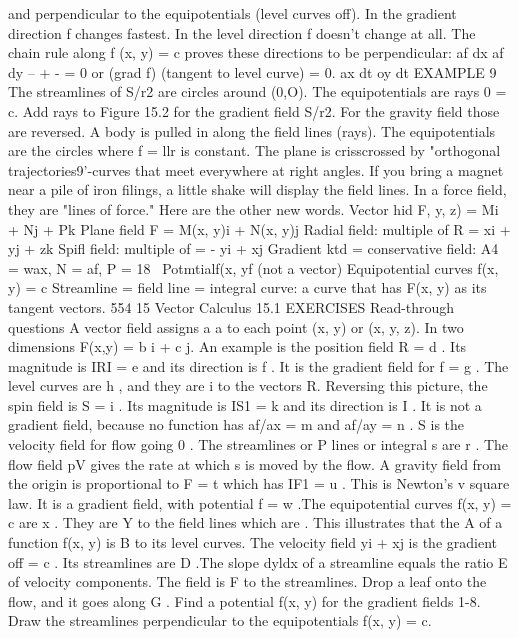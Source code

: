 and perpendicular to the equipotentials (level curves off).
In the gradient direction f changes fastest. In the level direction f doesn't change at
all. The chain rule along f (x, y) = c proves these directions to be perpendicular:
af dx af dy -- + - = 0 or (grad f) (tangent to level curve) = 0.
ax dt oy dt
EXAMPLE 9 The streamlines of S/r2 are circles around (0,O). The equipotentials are
rays 0 = c. Add rays to Figure 15.2 for the gradient field S/r2.
For the gravity field those are reversed. A body is pulled in along the field lines (rays).
The equipotentials are the circles where f = llr is constant. The plane is crisscrossed
by "orthogonal trajectories9'-curves that meet everywhere at right angles.
If you bring a magnet near a pile of iron filings, a little shake will display the field
lines. In a force field, they are "lines of force." Here are the other new words.
Vector hid F, y, z) = Mi + Nj + Pk Plane field F = M(x, y)i + N(x, y)j
Radial field: multiple of R = xi + yj + zk Spifl field: multiple of  = - yi + xj
Gradient ktd = conservative field: A4 = wax, N = af, P = 18~
Potmtialf(x, yf (not a vector) Equipotential curves f(x, y) = c
Streamline = field line = integral curve: a curve that has F(x, y) as its tangent
vectors. 
554 15 Vector Calculus
15.1 EXERCISES
Read-through questions
A vector field assigns a a to each point (x, y) or (x, y, z).
In two dimensions F(x,y) = b i + c j. An example is
the position field R = d . Its magnitude is IRI = e
and its direction is f . It is the gradient field for f =
g . The level curves are h , and they are i to
the vectors R.
Reversing this picture, the spin field is S = i . Its magnitude
is IS1 = k and its direction is I . It is not a
gradient field, because no function has af/ax = m and
af/ay = n . S is the velocity field for flow going 0 . The streamlines or P lines or integral s are r . The flow field pV gives the rate at which s is moved
by the flow.
A gravity field from the origin is proportional to F = t
which has IF1 = u . This is Newton's v square law.
It is a gradient field, with potential f = w .The equipotential
curves f(x, y) = c are x . They are Y to the field
lines which are . This illustrates that the A of a
function f(x, y) is B to its level curves.
The velocity field yi + xj is the gradient off = c . Its
streamlines are D .The slope dyldx of a streamline equals
the ratio E of velocity components. The field is F to
the streamlines. Drop a leaf onto the flow, and it goes along
G .
Find a potential f(x, y) for the gradient fields 1-8. Draw the
streamlines perpendicular to the equipotentials f(x, y) = c.
